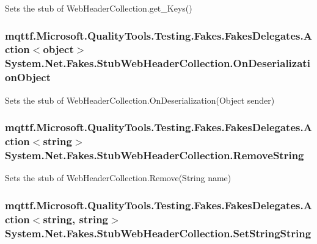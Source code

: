 Sets the stub of Web\-Header\-Collection.\-get\-\_\-\-Keys()

\hypertarget{class_system_1_1_net_1_1_fakes_1_1_stub_web_header_collection_a3c4aab9617e0f621404b1dcb01e9d7c2}{
\subsubsection[{On\-Deserialization\-Object}]{\setlength{\rightskip}{0pt plus 5cm}mqttf.\-Microsoft.\-Quality\-Tools.\-Testing.\-Fakes.\-Fakes\-Delegates.\-Action$<$object$>$ System.\-Net.\-Fakes.\-Stub\-Web\-Header\-Collection.\-On\-Deserialization\-Object}}\label{class_system_1_1_net_1_1_fakes_1_1_stub_web_header_collection_a3c4aab9617e0f621404b1dcb01e9d7c2}


Sets the stub of Web\-Header\-Collection.\-On\-Deserialization(\-Object sender)

\hypertarget{class_system_1_1_net_1_1_fakes_1_1_stub_web_header_collection_ad7e1ffd11541286d233c1b29f353f984}{
\subsubsection[{Remove\-String}]{\setlength{\rightskip}{0pt plus 5cm}mqttf.\-Microsoft.\-Quality\-Tools.\-Testing.\-Fakes.\-Fakes\-Delegates.\-Action$<$string$>$ System.\-Net.\-Fakes.\-Stub\-Web\-Header\-Collection.\-Remove\-String}}\label{class_system_1_1_net_1_1_fakes_1_1_stub_web_header_collection_ad7e1ffd11541286d233c1b29f353f984}


Sets the stub of Web\-Header\-Collection.\-Remove(\-String name)

\hypertarget{class_system_1_1_net_1_1_fakes_1_1_stub_web_header_collection_a21b90b6202e673e5910dab0a33976ca6}{
\subsubsection[{Set\-String\-String}]{\setlength{\rightskip}{0pt plus 5cm}mqttf.\-Microsoft.\-Quality\-Tools.\-Testing.\-Fakes.\-Fakes\-Delegates.\-Action$<$string, string$>$ System.\-Net.\-Fakes.\-Stub\-Web\-Header\-Collection.\-Set\-String\-String}}\label{class_system_1_1_net_1_1_fakes_1_1_stub_web_header_collection_a21b90b6202e673e5910dab0a33976ca6}


